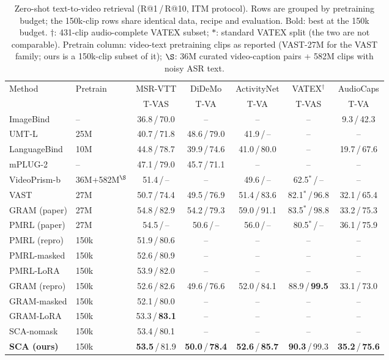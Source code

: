 \begin{table}[t]
\centering
\caption{Zero-shot text-to-video retrieval (R@1\,/\,R@10, ITM protocol). Rows are
grouped by pretraining budget; the 150k-clip rows share identical data, recipe and
evaluation. Bold: best at the 150k budget. $\dagger$: 431-clip audio-complete VATEX
subset; $*$: standard VATEX split (the two are not comparable). Pretrain column:
video-text pretraining clips as reported (VAST-27M for the VAST family; ours is a
150k-clip subset of it); $\S$: 36M curated video-caption pairs + 582M clips with
noisy ASR text.}
\label{tab:main_single}
\small
\begin{tabular}{llccccc}
\toprule
Method & Pretrain & MSR-VTT & DiDeMo & ActivityNet & VATEX$^{\dagger}$ & AudioCaps \\
 & & T-VAS & T-VA & T-VA & T-VAS & T-VA \\
\midrule
ImageBind & -- & 36.8\,/\,70.0 & -- & -- & -- & 9.3\,/\,42.3 \\
UMT-L & 25M & 40.7\,/\,71.8 & 48.6\,/\,79.0 & 41.9\,/\,-- & -- & -- \\
LanguageBind & 10M & 44.8\,/\,78.7 & 39.9\,/\,74.6 & 41.0\,/\,80.0 & -- & 19.7\,/\,67.6 \\
mPLUG-2 & -- & 47.1\,/\,79.0 & 45.7\,/\,71.1 & -- & -- & -- \\
VideoPrism-b & 36M+582M$^{\S}$ & 51.4\,/\,-- & -- & 49.6\,/\,-- & 62.5$^{*}$\,/\,-- & -- \\
VAST & 27M & 50.7\,/\,74.4 & 49.5\,/\,76.9 & 51.4\,/\,83.6 & 82.1$^{*}$\,/\,96.8 & 32.1\,/\,65.4 \\
GRAM (paper) & 27M & 54.8\,/\,82.9 & 54.2\,/\,79.3 & 59.0\,/\,91.1 & 83.5$^{*}$\,/\,98.8 & 33.2\,/\,75.3 \\
PMRL (paper) & 27M & 54.5\,/\,-- & 50.6\,/\,-- & 56.0\,/\,-- & 80.5$^{*}$\,/\,-- & 36.1\,/\,75.9 \\
\midrule
PMRL (repro) & 150k & 51.9\,/\,80.6 & -- & -- & -- & -- \\
PMRL-masked & 150k & 52.6\,/\,80.9 & -- & -- & -- & -- \\
PMRL-LoRA & 150k & 53.9\,/\,82.0 & -- & -- & -- & -- \\
GRAM (repro) & 150k & 52.6\,/\,82.6 & 49.6\,/\,76.6 & 52.0\,/\,84.1 & 88.9\,/\,\textbf{99.5} & 33.1\,/\,73.0 \\
GRAM-masked & 150k & 52.1\,/\,80.0 & -- & -- & -- & -- \\
GRAM-LoRA & 150k & 53.3\,/\,\textbf{83.1} & -- & -- & -- & -- \\
SCA-nomask & 150k & 53.4\,/\,80.1 & -- & -- & -- & -- \\
\textbf{SCA (ours)} & 150k & \textbf{53.5}\,/\,81.9 & \textbf{50.0}\,/\,\textbf{78.4} & \textbf{52.6}\,/\,\textbf{85.7} & \textbf{90.3}\,/\,99.3 & \textbf{35.2}\,/\,\textbf{75.6} \\
\bottomrule
\end{tabular}
\end{table}
